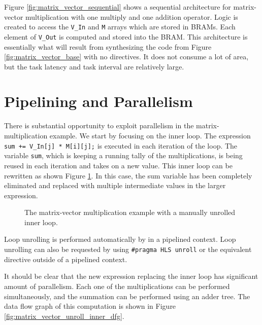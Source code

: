 Figure \ref{fig:matrix_vector_sequential} shows a sequential architecture for matrix-vector multiplication with one multiply and one addition operator.  Logic is created to access the \lstinline|V_In| and \lstinline|M| arrays which are stored in BRAMs. Each element of \lstinline|V_Out| is computed and stored into the BRAM. This architecture is essentially what will result from synthesizing the code from Figure \ref{fig:matrix_vector_base} with no directives. It does not consume a lot of area, but the task latency and task interval are relatively large.

\section{Pipelining and Parallelism}

There is substantial opportunity to exploit parallelism in the matrix-multiplication example. We start by focusing on the inner loop. The expression \lstinline|sum += V_In[j] * M[i][j];| is executed in each iteration of the loop. The variable \lstinline|sum|, which is keeping a running tally of the multiplications, is being reused in each iteration and takes on a new value. This inner loop can be rewritten as shown Figure \ref{fig:matrix_vector_base_unroll_inner}.  In this case, the sum variable has been completely eliminated and replaced with multiple intermediate values in the larger expression.

\begin{figure}
\begin{footnotesize}

\end{footnotesize}
\caption{The matrix-vector multiplication example with a manually unrolled inner loop.}
\label{fig:matrix_vector_base_unroll_inner}
\end{figure}


\begin{aside}
Loop unrolling is performed automatically by \VHLS in a pipelined context.  Loop unrolling can also be requested by using \lstinline|#pragma HLS unroll| or the equivalent directive outside of a pipelined context.  
\end{aside} 

It should be clear that the new expression replacing the inner loop has significant amount of parallelism. Each one of the multiplications can be performed simultaneously, and the summation can be performed using an adder tree. The data flow graph of this computation is shown in Figure \ref{fig:matrix_vector_unroll_inner_dfg}. 

